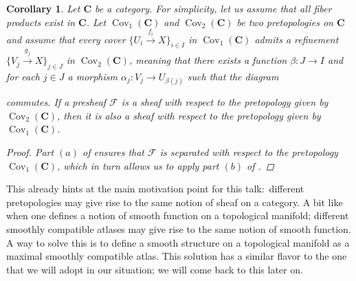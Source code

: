 \documentclass[12pt,reqno,a4paper]{amsart}
\theoremstyle{plain}
\newtheorem{cor}[thm]{Corollary}
\theoremstyle{definition}
\theoremstyle{remark}
\begin{document}
\begin{cor}\label{cor:refinement}
  Let $\mathbf{C}$ be a category.
  For simplicity, let us assume that all fiber products exist in $\mathbf{C}$.
  Let $\operatorname{Cov}_{1}(\mathbf{C})$ and $\operatorname{Cov}_{2}(\mathbf{C})$ be two pretopologies on $\mathbf{C}$ and assume that every cover $\{ U_{i} \xrightarrow{f_{i}} X \}_{i \in I}$ in $\operatorname{Cov}_{1}(\mathbf{C})$ admits a refinement $\{ V_{j} \xrightarrow{g_{j}} X \}_{j \in J}$ in $\operatorname{Cov}_{2}(\mathbf{C})$, meaning that there exists a function $\beta \colon J \to I$ and for each $j \in J$ a morphism $\alpha_{j} \colon V_{j} \to U_{\beta(j)}$ such that the diagram
  \begin{center}
  \end{center}
  commutes.
  If a presheaf $\mathscr{F}$ is a sheaf with respect to the pretopology given by $\operatorname{Cov}_{2}(\mathbf{C})$, then it is also a sheaf with respect to the pretopology given by $\operatorname{Cov}_{1}(\mathbf{C})$.
  \begin{proof}
    Part $(a)$ of  ensures that $\mathscr{F}$ is separated with respect to the pretopology $\operatorname{Cov}_{1}(\mathbf{C})$, which in turn allows us to apply part $(b)$ of .
  \end{proof}
\end{cor}

This already hints at the main motivation point for this talk:~different pretopologies may give rise to the same notion of sheaf on a category.
A bit like when one defines a notion of smooth function on a topological manifold; different smoothly compatible atlases may give rise to the same notion of smooth function.
A way to solve this is to define a smooth structure on a topological manifold as a maximal smoothly compatible atlas.
This solution has a similar flavor to the one that we will adopt in our situation; we will come back to this later on.
\end{document}

